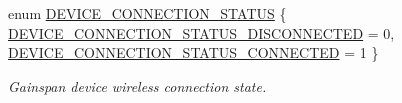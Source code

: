 \begin{DoxyCompactItemize}
\item 
enum \hyperlink{group__wireless__interface_gab5114867e594e54bbfdb6552c8650fff}{D\+E\+V\+I\+C\+E\+\_\+\+C\+O\+N\+N\+E\+C\+T\+I\+O\+N\+\_\+\+S\+T\+A\+T\+US} \{ \hyperlink{group__wireless__interface_ggab5114867e594e54bbfdb6552c8650fffa630df63be189e1831a19b66935312a88}{D\+E\+V\+I\+C\+E\+\_\+\+C\+O\+N\+N\+E\+C\+T\+I\+O\+N\+\_\+\+S\+T\+A\+T\+U\+S\+\_\+\+D\+I\+S\+C\+O\+N\+N\+E\+C\+T\+ED} = 0, 
\hyperlink{group__wireless__interface_ggab5114867e594e54bbfdb6552c8650fffa75fc9cc2b093511fd1a70dccecc7750f}{D\+E\+V\+I\+C\+E\+\_\+\+C\+O\+N\+N\+E\+C\+T\+I\+O\+N\+\_\+\+S\+T\+A\+T\+U\+S\+\_\+\+C\+O\+N\+N\+E\+C\+T\+ED} = 1
 \}\begin{DoxyCompactList}\small\item\em Gainspan device wireless connection state. \end{DoxyCompactList}
\end{DoxyCompactItemize}
